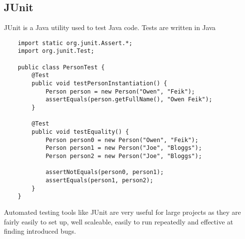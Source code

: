 \documentclass[12pt]{report}
\begin{document}
\begin{flushleft}
\subsection*{JUnit}

JUnit is a Java utility used to test Java code. Tests are written in Java 

\begin{lstlisting}
    import static org.junit.Assert.*;
    import org.junit.Test;
    
    public class PersonTest {
        @Test
        public void testPersonInstantiation() {
            Person person = new Person("Owen", "Feik");
            assertEquals(person.getFullName(), "Owen Feik");
        }

        @Test
        public void testEquality() {
            Person person0 = new Person("Owen", "Feik");
            Person person1 = new Person("Joe", "Bloggs");
            Person person2 = new Person("Joe", "Bloggs");

            assertNotEquals(person0, person1);
            assertEquals(person1, person2);
        }
    }
\end{lstlisting}

Automated testing tools like JUnit are very useful for large projects as they
are fairly easily to set up, well scaleable, easily to run repeatedly and
effective at finding introduced bugs.

\end{flushleft}
\end{document}
